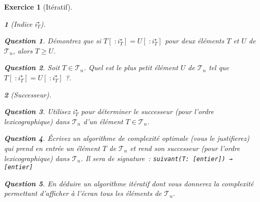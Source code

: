 \documentclass{article}
\theoremstyle{exostyle}
\newtheorem{exo}{Exercice}
\theoremstyle{partiestyle}
\newtheorem{partie}{}[exo]
\theoremstyle{questionstyle}
\newtheorem{questionpartie}{Question}[partie]
\begin{document}
\begin{exo}[Itératif]
\begin{partie}[Indice $i^\star_{T}$]
        \begin{questionpartie}
            Démontrez que si $T[\;:i^\star_{T}] = U[\;:i^\star_{T}]$ pour deux éléments $T$ et $U$ de $\mathcal{T}_n$, alors $T \geq U$.
        \end{questionpartie}
        \begin{questionpartie}
            Soit $T \in \mathcal{T}_n$. Quel est le plus petit élément $U$ de $\mathcal{T}_n$ tel 
            que $T[\;:i^\star_{T}] = U[\;:i^\star_{T}]$ ?.
        \end{questionpartie}
    \end{partie}
    \begin{partie}[Successeur]
        \begin{questionpartie}
            Utilisez $i^\star_{T}$ pour déterminer le successeur (pour l'ordre lexicographique) dans $\mathcal{T}_n$ d'un élément $T \in \mathcal{T}_n$.
        \end{questionpartie}
        \begin{questionpartie}
            Écrivez un algorithme de complexité optimale (vous le justifierez) qui prend en entrée un élément $T$ de $\mathcal{T}_n$ et rend son successeur (pour l'ordre lexicographique) dans $\mathcal{T}_n$. Il sera de signature~:
              \verb|suivant(T: [entier]) → [entier]| 
        \end{questionpartie}
        \begin{questionpartie}
            En déduire un algorithme itératif dont vous donnerez la complexité permettant d'afficher à l'écran tous les éléments de $\mathcal{T}_n$.
        \end{questionpartie}
    \end{partie}
\end{exo}
\end{document}
